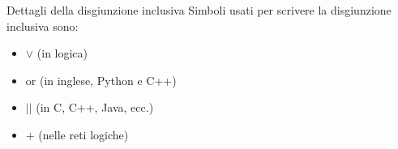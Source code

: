 \documentclass[aspectratio=169,10pt,dvipsnames,handout]{beamer}
\begin{document}
\begin{frame}{Dettagli della disgiunzione inclusiva}
    Simboli usati per scrivere la disgiunzione inclusiva sono:
    \begin{itemize}
        \item \alert{$\lor$ (in logica)}
        \item \alert{or (in inglese, Python e C++)}
        \item $\texttt{||}$ (in C, C++, Java, ecc.)
        \item $+$ (nelle reti logiche)
    \end{itemize}

\end{frame}
\end{document}
